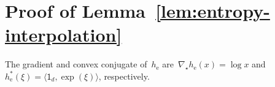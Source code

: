 \documentclass[11pt]{article}
\numberwithin{equation}{section}
\newcommand{\e}{{\mathrm{e}}}
\theoremstyle{remark}
\newcommand{\R}{\mathbb{R}}
\newcommand{\ip}[2]{\left\langle #1,#2\right\rangle}
\newcommand{\ones}{\mathsf{1}_d}
\newcommand{\Ent}{\textup{\textsf{Ent}}}
\newcommand{\Diag}{\textup{Diag}}
\newcommand{\Orc}{\mathscr{O}}
\newcommand{\Mtd}{\mathscr{M}}
\newcommand{\FOM}{\textsf{FOM}}
\newcommand{\Fh}{\Ent_d}
\newcommand{\Simp}{\Delta_d}
\newcommand{\cI}{\mathcal{I}}
\newcommand{\Dens}{\boldsymbol{\Delta}_d}
\newcommand{\Qd}{\mathsf{Ent}_d^\mathsf{H}}
\DeclareMathOperator{\diag}{diag}
\newcommand{\1}{\mathbf{1}}
\newcommand{\bnabla}{\nabla}
\begin{document}
%


\section{Proof of Lemma~\ref{lem:entropy-interpolation}} 
\label{app:interpol}

The gradient and convex conjugate of~$h_\e$ are~$\nabla_{\star} h_\e(x)=\log x$ and $h_\e^*(\xi)= \langle \ones, \exp(\xi) \rangle$, respectively. 
\end{document}
